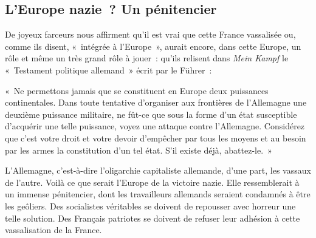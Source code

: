 \documentclass[french,twoside]{book} %
\newenvironment{quoteblock}%
  {\begin{quoting}}
  {\end{quoting}}
\newenvironment{quotebar}{%
    \def\FrameCommand{{\color{rubric!10!}\vrule width 0.5em} \hspace{0.9em}}%
    \def\OuterFrameSep{\itemsep} %
    \MakeFramed {\advance\hsize-\width \FrameRestore}
  }%
  {%
    \endMakeFramed
  }
\renewenvironment{quoteblock}%
  {%
    \savenotes
    \setstretch{0.9}
    \normalfont
    \begin{quotebar}
  }
  {%
    \end{quotebar}
    \spewnotes
  }
\begin{document}
\subsection[L’Europe nazie ? Un pénitencier]{L’Europe nazie ? Un pénitencier}
\noindent De joyeux farceurs nous affirment qu’il est vrai que cette France vassalisée ou, comme ils disent, « intégrée à l’Europe », aurait encore, dans cette Europe, un rôle et même un très grand rôle à jouer : qu’ils relisent dans \emph{Mein Kampf} le « Testament politique allemand » écrit par le Führer :\par

\begin{quoteblock}
 \noindent « Ne permettons jamais que se constituent en Europe deux puissances continentales. Dans toute tentative d’organiser aux frontières de l’Allemagne une deuxième puissance militaire, ne fût-ce que sous la forme d’un état susceptible d’acquérir une telle puissance, voyez une attaque contre l’Allemagne. Considérez que c’est votre droit et votre devoir d’empêcher par tous les moyens et au besoin par les armes la constitution d’un tel état. S’il existe déjà, abattez-le. »
 \end{quoteblock}

\noindent L’Allemagne, c’est-à-dire l’oligarchie capitaliste allemande, d’une part, les vassaux de l’autre. Voilà ce que serait l’Europe de la victoire nazie. Elle ressemblerait à un immense pénitencier, dont les travailleurs allemands seraient condamnés à être les geôliers. Des socialistes véritables se doivent de repousser avec horreur une telle solution. Des Français patriotes se doivent de refuser leur adhésion à cette vassalisation de la France.
\end{document}
